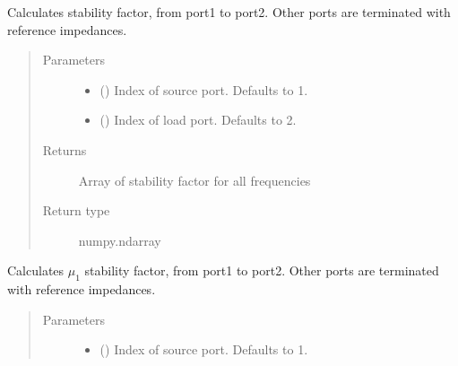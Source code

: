 \documentclass[letterpaper,10pt,english]{sphinxmanual}
\begin{document}
\begin{fulllineitems}
\begin{fulllineitems}
\label{\detokenize{touchstone:touchstone.spfile.stability_factor_k}}
Calculates  stability factor, from port1 to port2. Other ports are terminated with reference impedances.
\begin{quote}\begin{description}
\item[{Parameters}] \leavevmode\begin{itemize}
\item {} 
 (\sphinxstyleliteralemphasis{\sphinxupquote{, }}) \textendash{} Index of source port. Defaults to 1.

\item {} 
 (\sphinxstyleliteralemphasis{\sphinxupquote{, }}) \textendash{} Index of load port. Defaults to 2.

\end{itemize}

\item[{Returns}] \leavevmode
Array of stability factor for all frequencies

\item[{Return type}] \leavevmode
numpy.ndarray

\end{description}\end{quote}

\end{fulllineitems}


\begin{fulllineitems}
\label{\detokenize{touchstone:touchstone.spfile.stability_factor_mu1}}
Calculates \(\mu_1\) stability factor, from port1 to port2. Other ports are terminated with reference impedances.
\begin{quote}\begin{description}
\item[{Parameters}] \leavevmode\begin{itemize}
\item {} 
 (\sphinxstyleliteralemphasis{\sphinxupquote{, }}) \textendash{} Index of source port. Defaults to 1.


\end{itemize}
\end{description}
\end{quote}
\end{fulllineitems}
\end{fulllineitems}
\end{document}
